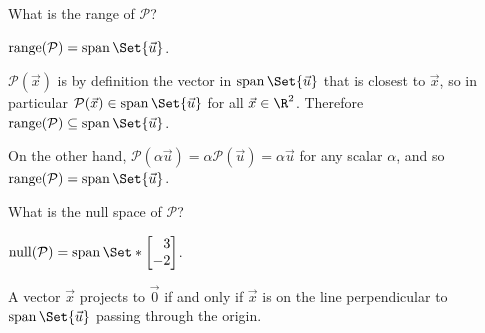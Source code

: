 \documentclass{problemset}
\DeclareMathOperator{\Span}{span}
\DeclareMathOperator{\Range}{range}
\DeclareMathOperator{\Null}{null}
\newcommand{\mat}[1]{\begin{bmatrix*}[r]#1\end{bmatrix*}}
\begin{document}
	\begin{parts}
		\item What is the range of $\mathcal P$?
			\begin{solution}
				$\Range(\mathcal P)=\Span\Set{\vec u}$.

				$\mathcal P(\vec x)$ is by definition the vector in $\Span\Set{\vec u}$
				that is closest to $\vec x$, so in particular
				$\mathcal P(\vec x) \in \Span\Set{\vec u}$ for all $\vec x\in\R^2$.
				Therefore $\Range(\mathcal P)\subseteq\Span\Set{\vec u}$.

				On the other hand, $\mathcal P(\alpha \vec u)=\alpha\mathcal P(\vec u)=\alpha\vec u$
				for any scalar $\alpha$, and so $\Range(\mathcal P)=\Span\Set{\vec u}$.
			\end{solution}
		\item What is the null space of $\mathcal P$?
			\begin{solution}
				\begin{solution}
					$\Null(\mathcal P)=\Span\Set*{\mat{3\\-2}}$.

					A vector $\vec x$ projects to $\vec 0$ if and only if $\vec x$
					is on the line perpendicular to $\Span\Set{\vec u}$ passing
					through the origin.
				\end{solution}
			\end{solution}
	\end{parts}
\end{document}
